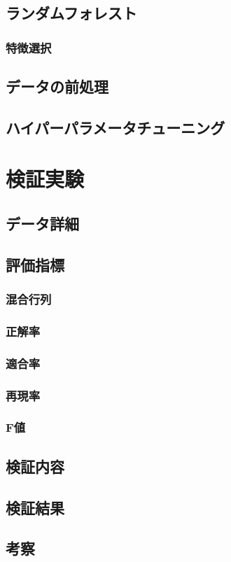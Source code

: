 \documentclass[platex]{suribt}
\begin{document}
\section{ランダムフォレスト}
\subsection{特徴選択}
\section{データの前処理}
\section{ハイパーパラメータチューニング}

\chapter{検証実験}
\section{データ詳細}
\section{評価指標}
\subsection{混合行列}
\subsection{正解率}
\subsection{適合率}
\subsection{再現率}
\subsection{F値}
\section{検証内容}
\section{検証結果}
\section{考察}
\end{document}
